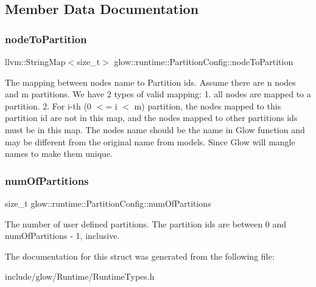 \subsection{Member Data Documentation}
\mbox{\label{structglow_1_1runtime_1_1_partition_config_a9c69e065e0deae286621ec4f5960b120}} 
\subsubsection{\texorpdfstring{node\+To\+Partition}{nodeToPartition}}
{\footnotesize\ttfamily llvm\+::\+String\+Map$<$size\+\_\+t$>$ glow\+::runtime\+::\+Partition\+Config\+::node\+To\+Partition}

The mapping between nodes\textquotesingle{} name to Partition ids. Assume there are n nodes and m partitions. We have 2 types of valid mapping\+: 1. all nodes are mapped to a partition. 2. For i-\/th (0 $<$= i $<$ m) partition, the nodes mapped to this partition id are not in this map, and the nodes mapped to other partitions ids must be in this map. The node\textquotesingle{}s name should be the name in Glow function and may be different from the original name from models. Since Glow will mangle names to make them unique. \mbox{\label{structglow_1_1runtime_1_1_partition_config_a71d054f8aae8baf57efcee229470c8cb}} 
\subsubsection{\texorpdfstring{num\+Of\+Partitions}{numOfPartitions}}
{\footnotesize\ttfamily size\+\_\+t glow\+::runtime\+::\+Partition\+Config\+::num\+Of\+Partitions}

The number of user defined partitions. The partition ids are between 0 and num\+Of\+Partitions -\/ 1, inclusive. 

The documentation for this struct was generated from the following file\+:\begin{DoxyCompactItemize}
\item 
include/glow/\+Runtime/Runtime\+Types.\+h\end{DoxyCompactItemize}
